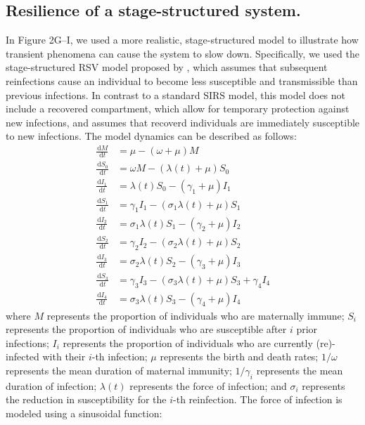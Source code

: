 \documentclass[12pt]{article}
\newcommand{\dd}[1]{\ensuremath{\, \mathrm{d}#1}}
\begin{document}
\subsection*{Resilience of a stage-structured system.}

In Figure 2G--I, we used a more realistic, stage-structured model to illustrate how transient phenomena can cause the system to slow down.
Specifically, we used the stage-structured RSV model proposed by \citep{pitzer2015environmental}, which assumes that subsequent reinfections cause an individual to become less susceptible and transmissible than previous infections.
In contrast to a standard SIRS model, this model does not include a recovered compartment, which allow for temporary protection against new infections, and assumes that recoverd individuals are immediately susceptible to new infections.
The model dynamics can be described as follows:
\begin{align}
\frac{\dd M}{\dd t} &= \mu - (\omega + \mu) M\\
\frac{\dd S_0}{\dd t} &= \omega M - (\lambda(t) + \mu) S_0\\
\frac{\dd I_1}{\dd t} &= \lambda(t) S_0 - (\gamma_1 + \mu) I_1\\
\frac{\dd S_1}{\dd t} &= \gamma_1 I_1 - (\sigma_1 \lambda(t) + \mu) S_1\\
\frac{\dd I_2}{\dd t} &= \sigma_1 \lambda(t) S_1 - (\gamma_2 + \mu) I_2\\
\frac{\dd S_2}{\dd t} &= \gamma_2 I_2 - (\sigma_2 \lambda(t) + \mu) S_2\\
\frac{\dd I_3}{\dd t} &= \sigma_2 \lambda(t) S_2 - (\gamma_3 + \mu) I_3\\
\frac{\dd S_3}{\dd t} &= \gamma_3 I_3 - (\sigma_3 \lambda(t) + \mu) S_3 + \gamma_4 I_4\\
\frac{\dd I_4}{\dd t} &= \sigma_3 \lambda(t) S_3 - (\gamma_4 + \mu) I_4
\end{align}
where $M$ represents the proportion of individuals who are maternally immune;
$S_i$ represents the proportion of individuals who are susceptible after $i$ prior infections;
$I_i$ represents the proportion of individuals who are currently (re)-infected with their $i$-th infection;
$\mu$ represents the birth and death rates;
$1/\omega$ represents the mean duration of maternal immunity;
$1/\gamma_i$ represents the mean duration of infection;
$\lambda(t)$ represents the force of infection;
and $\sigma_i$ represents the reduction in susceptibility for the $i$-th reinfection.
The force of infection is modeled using a sinusoidal function:
\end{document}
